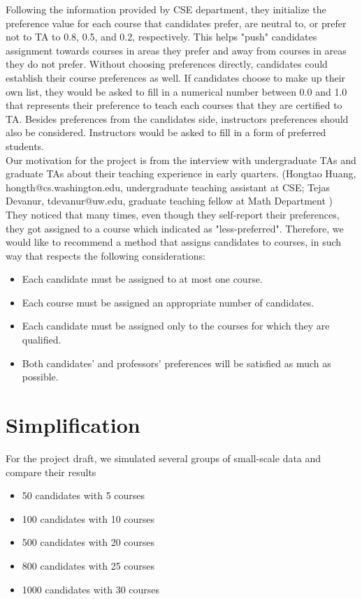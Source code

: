 \documentclass[twoside,twocolumn]{article}
\begin{document}
    \indent Following the information provided by CSE department, they initialize the preference value for each course that candidates prefer, 
    are neutral to, or prefer not to TA to 0.8, 0.5, and 0.2, respectively. This helps "push" candidates assignment towards courses 
    in areas they prefer and away from courses in areas they do not prefer. Without choosing preferences directly, candidates could establish
    their course preferences as well. If candidates choose to make up their own list, they would be asked to fill in a numerical number 
    between 0.0 and 1.0 that represents their preference to teach each courses that they are certified to TA. Besides preferences from 
    the candidates side, instructors preferences should also be considered. Instructors would be asked to fill in a form of preferred students.
    \\ \indent Our motivation for the project is from the interview with undergraduate TAs and graduate TAs about their teaching experience in early quarters.
    (Hongtao Huang, hongth@cs.washington.edu, undergraduate teaching assistant at CSE; Tejas Devanur, tdevanur@uw.edu, graduate teaching fellow at Math Department
    ) They noticed that many times, even though they self-report their preferences, they got assigned to a course which 
    indicated as "less-preferred". Therefore, we would like to recommend a method that assigns candidates to
    courses, in such way that respects the following considerations:
    \begin{itemize}
        \item Each candidate must be assigned to at most one course.
        \item Each course must be assigned an appropriate number of candidates.
        \item Each candidate must be assigned only to the courses for which they are qualified.
        \item Both candidates' and professors' preferences will be satisfied as much as possible.
    \end{itemize}
    \section{Simplification}
    \indent For the project draft, we simulated several groups of small-scale data and compare their results 
    \begin{itemize}
        \item 50 candidates with 5 courses
        \item 100 candidates with 10 courses
        \item 500 candidates with 20 courses
        \item 800 candidates with 25 courses
        \item 1000 candidates with 30 courses
    \end{itemize}
\end{document}
